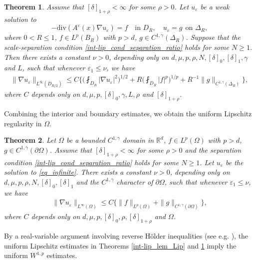 \documentclass[reqno,12pt]{amsart} %
\newtheorem{theorem}{Theorem}[section]
\theoremstyle{definition}
\theoremstyle{remark}
\numberwithin{equation}{section}
\newcommand{\R}{\mathbb{R}}
\newcommand{\e}{\varepsilon}
\begin{document}
\begin{theorem}\label{Lip-B}
    Assume that $[\delta]_{1+\rho}<\infty$ for some $\rho>0$. Let $u_\varepsilon$ be a weak solution to 
    \begin{equation*}
        -\mathrm{div}(A^\varepsilon(x)\nabla u_\varepsilon)=f \quad \text{in }D_R,\quad u_\varepsilon=g\ \ \text{on }\Delta_R,
    \end{equation*}
    where $0<R\leq 1$, $f\in L^p(B_{R})$ with $p>d$, $g\in C^{1, \gamma}(\Delta_R)$. Suppose that the scale-separation condition \eqref{int-lip_cond_separation_ratio} holds for some $N\geq 1$. Then there exists a constant $\nu>0$, depending only on $d, \mu, p, \rho, N, [\delta]_0, [\delta]_1, \gamma$ and $L$, such that whenever $\varepsilon_1\leq \nu$, we have
  \begin{align*}
    \| \nabla u_\e\|_{L^\infty(D_{R/2})} \leq C\bigg\{\bigg(\fint_{D_{R}}|\nabla u_\varepsilon|^2\bigg)^{1/2}+R\bigg(\fint_{D_{R}}|f|^p\bigg)^{1/p}+R^{-1}\|g\|_{C^{1, \gamma}(\Delta_R)}\bigg\},
  \end{align*}
  where $C$ depends only on $d, \mu, p, [\delta]_0, \gamma, L, \rho$ and $[\delta]_{1+\rho}$. 
\end{theorem}

Combining the interior and boundary estimates, we obtain the uniform Lipschitz regularity in $\Omega$.

\begin{theorem}\label{Lip-BB}
  Let $\Omega$ be a bounded $C^{1, \gamma}$ domain in $\R^d$, $f\in L^p(\Omega)$ with $p>d$, $g\in C^{1, \gamma}(\partial\Omega)$. Assume that $[\delta]_{1+\rho}<\infty$ for some $\rho>0$ and the separation condition \eqref{int-lip_cond_separation_ratio} holds for some $N\geq 1$. Let $u_\varepsilon$ be the solution to \eqref{eq_infinite}. There exists a constant $\nu>0$, depending only on $d, \mu, p, \rho, N, [\delta]_0, [\delta]_1$ and the $C^{1, \gamma}$ character of $\partial\Omega$, such that whenever $\varepsilon_1\leq \nu$, we have
  \begin{align*}
    \|\nabla u_\varepsilon\|_{L^\infty(\Omega)}\leq C\{\|f\|_{L^p(\Omega)}+\|g\|_{C^{1, \gamma}(\partial\Omega)}\},
  \end{align*}
  where $C$ depends only on $d, \mu, p, [\delta]_0, \rho, [\delta]_{1+\rho}$ and $\Omega$. 
\end{theorem}

By a real-variable argument involving reverse H\"older inequalities (see e.g. \cite{Shen_book}), the uniform Lipschitz estimates in Theorems \ref{int-lip_lem_Lip} and \ref{Lip-B} imply the uniform $W^{1, p}$ estimates.
\end{document}
